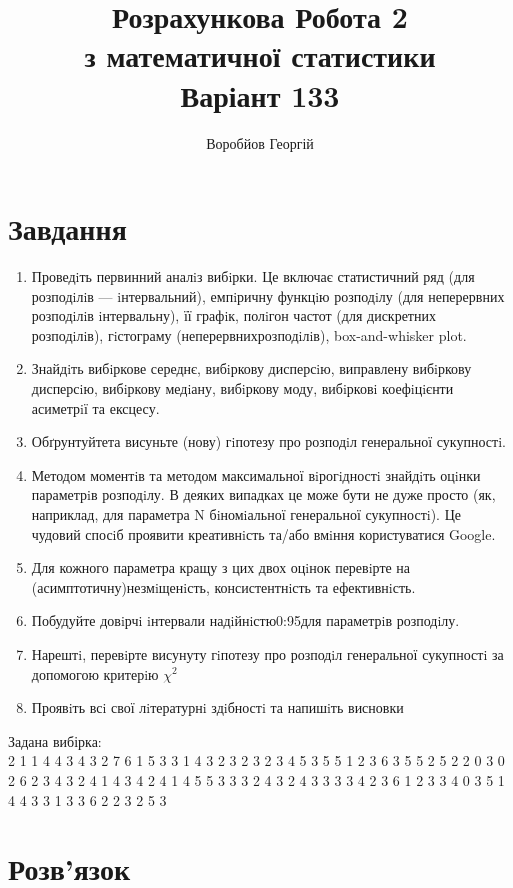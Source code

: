 \documentclass{article}
\title{Розрахункова Робота 2 \\
        з математичної статистики\\ 
        Варіант 133}
\author{Воробйов Георгій}
\begin{document}
\maketitle

\tableofcontents

\section{Завдання}
\begin{enumerate}
    \item Проведiть первинний аналiз вибiрки. Це включає статистичний ряд (для розподiлiв —
        iнтервальний), емпiричну функцiю розподiлу (для неперервних розподiлiв iнтервальну), її
        графiк, полiгон частот (для дискретних розподiлiв), гiстограму (неперервнихрозподiлiв), box-and-whisker 
        plot.
    \item Знайдiть вибiркове середнє, вибiркову дисперсiю, виправлену вибiркову дисперсiю, вибiркову
        медiану, вибiркову моду, вибiрковi коефiцiєнти асиметрiї та ексцесу.
    \item Обґрунтуйтета висуньте (нову) гiпотезу про розподiл генеральної сукупностi. 
    \item Методом моментiв та методом максимальної вiрогiдностi знайдiть оцiнки параметрiв
        розподiлу. В деяких випадках це може бути не дуже просто (як, наприклад, для
        параметра N бiномiальної генеральної сукупностi). Це чудовий спосiб проявити креативнiсть
        та/або вмiння користуватися Google.
    \item Для кожного параметра кращу з цих двох оцiнок перевiрте на (асимптотичну)незмiщенiсть, консистентнiсть 
        та ефективнiсть.
    \item Побудуйте довiрчi iнтервали надiйнiстю0:95для параметрiв розподiлу.
    \item Нарештi, перевiрте висунуту гiпотезу про розподiл генеральної сукупностi за
        допомогою критерiю $\chi^2$
    \item Проявiть всi свої лiтературнi здiбностi та напишiть висновки
\end{enumerate}
Задана вибірка: \\ 
2  1  1  4  4  3  4  3  2  7  6  1  5  3  3  1  4  3  2  3  2  3  2  3  4 5  3  5  5  1  2  3  6  3
5  5  2  5  2  2  0  3  0  2  6  2  3  4  3  2 4  1  4  3  4  2  4  1  4  5  5  3  3  3  2  4  3  2
4  3  3  3  3  4  2 3  6  1  2  3  3  4  0  3  5  1  4  4  3  3  1  3  3  6  2  2  3  2  5  3 
\section{Розв'язок}
\end{document}
